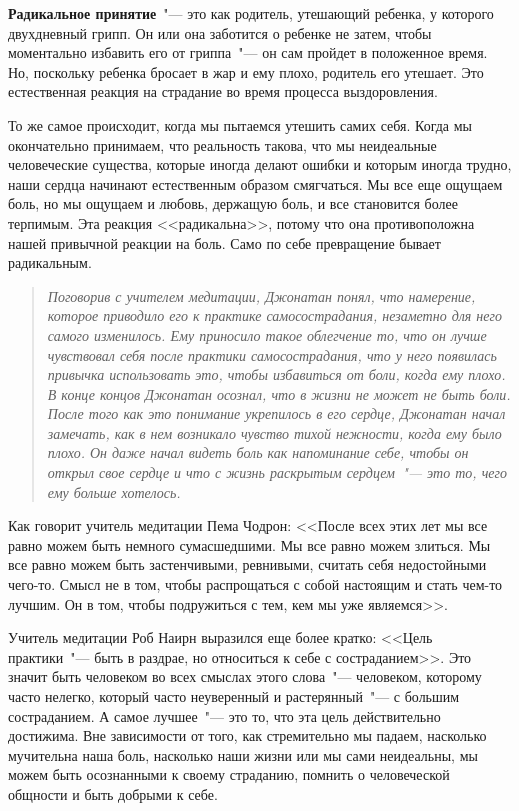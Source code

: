 \textbf{Радикальное принятие}~"--- это как родитель, утешающий ребенка, у которого двухдневный грипп. Он или она заботится о ребенке не затем, чтобы моментально избавить его от гриппа~"--- он сам пройдет в положенное время. Но, поскольку ребенка бросает в жар и ему плохо, родитель его утешает. Это естественная реакция на страдание во время процесса выздоровления.

То же самое происходит, когда мы пытаемся утешить самих себя. Когда мы окончательно принимаем, что реальность такова, что мы неидеальные человеческие существа, которые иногда делают ошибки и которым иногда трудно, наши сердца начинают естественным образом смягчаться. Мы все еще ощущаем боль, но мы ощущаем и любовь, держащую боль, и все становится более терпимым. Эта реакция <<радикальна>>, потому что она противоположна нашей привычной реакции на боль. Само по себе превращение бывает радикальным. 

\begin{quotation}
	\textit{
		Поговорив с учителем медитации, Джонатан понял, что намерение, которое приводило его к  	практике самосострадания, незаметно для него самого изменилось. Ему приносило такое облегчение то, что он лучше чувствовал себя после практики самосострадания, что у него появилась привычка использовать это, чтобы избавиться от боли, когда ему плохо. В конце концов Джонатан осознал, что в жизни не может не быть боли. После того как это понимание укрепилось в его сердце, Джонатан начал замечать, как в нем возникало чувство тихой нежности, когда ему было плохо. Он даже начал видеть боль как напоминание себе, чтобы он открыл свое сердце и что с жизнь раскрытым сердцем~"--- это то, чего ему больше хотелось.
	}
\end{quotation}

Как говорит учитель медитации Пема Чодрон: <<После всех этих лет мы все равно можем быть немного сумасшедшими. Мы все равно можем злиться. Мы все равно можем быть застенчивыми, ревнивыми, считать себя недостойными чего-то. Смысл не в том, чтобы распрощаться с собой настоящим и стать чем-то лучшим. Он в том, чтобы подружиться с тем, кем мы уже являемся>>.

Учитель медитации Роб Наирн выразился еще более кратко: <<Цель практики~"--- быть в раздрае, но относиться к себе с состраданием>>. Это значит быть человеком во всех смыслах этого слова~"--- человеком, которому часто нелегко, который часто неуверенный и растерянный~"--- с большим состраданием.  А самое лучшее~"--- это то, что эта цель действительно достижима. Вне зависимости от того, как стремительно мы падаем, насколько мучительна наша боль, насколько наши жизни или мы сами неидеальны, мы можем быть осознанными к своему страданию, помнить о человеческой общности и быть добрыми к себе.

